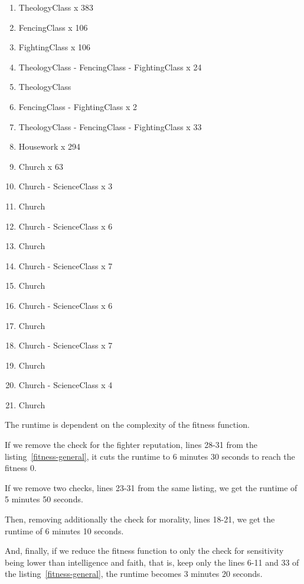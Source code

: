\documentclass[12pt, a4paper]{report}
\begin{document}
	\begin{enumerate}
		\item TheologyClass x 383
		\item FencingClass x 106
		\item FightingClass x 106

		\item TheologyClass - FencingClass - FightingClass x 24
	
		\item TheologyClass
		\item FencingClass - FightingClass x 2

		\item TheologyClass - FencingClass - FightingClass x 33

		\item Housework x 294
		\item Church x 63
		\item Church - ScienceClass x 3
		\item Church
		\item Church - ScienceClass x 6
		\item Church
		\item Church - ScienceClass x 7
		\item Church
		\item Church - ScienceClass x 6
		\item Church
		\item Church - ScienceClass x 7
		\item Church
		\item Church - ScienceClass x 4
		\item Church
	\end{enumerate}
	
	The runtime is dependent on the complexity of the fitness function.
	
	If we remove the check for the fighter reputation, lines 28-31 from the listing~\ref{fitness-general},
	it cuts the runtime to 6 minutes 30 seconds to reach the fitness 0.
	
	If we remove two checks, lines 23-31 from the same listing, we get the runtime of 5 minutes 50 seconds.
	
	Then, removing additionally the check for morality, lines 18-21, we get the runtime of 6 minutes 10 seconds.
	
	And, finally, if we reduce the fitness function to only the check for sensitivity being lower than intelligence and faith, that is, keep only the lines 6-11 and 33 of the listing~\ref{fitness-general}, the runtime becomes 3 minutes 20 seconds.
	
\end{document}

